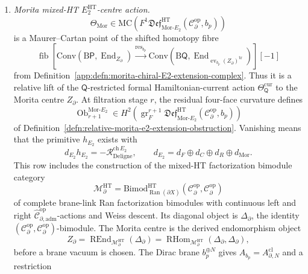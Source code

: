 \begin{defn}
\begin{enumerate}[label=\textup{(D\arabic*)}]
	  \item \emph{Morita mixed-HT \(E_2^{\mathrm{HT}}\)-centre action.}
    \[
      \Theta_{\mathrm{Mor}}
      \in
      \mathrm{MC}\!\left(
      F^1\mathfrak{Def}^{\mathrm{HT}}_{\mathrm{Mor}\mbox{-}E_2}
      (\mathcal C^{\mathrm{op}}_\partial,b_p)\right)
    \]
    is a Maurer--Cartan point of the shifted homotopy fibre
    \[
      \operatorname{fib}\!\left[
      \mathrm{Conv}(\mathrm B\mathsf P,\operatorname{End}_{Z_\partial})
      \xrightarrow{\operatorname{res}_{b_p}}
      \mathrm{Conv}\!\left(\mathrm B\mathsf Q,
      \operatorname{End}_{\operatorname{ev}_{b_p}(Z_\partial)^{\mathrm{tr}}}
      \right)\right][-1]
    \]
    from Definition~\ref{app:defn:morita-chiral-E2-extension-complex}.
    Thus it is a relative lift of the \(\mathsf Q\)-restricted formal
    Hamiltonian-current action \(\Theta_{\mathsf Q}^{\mathrm{cur}}\) to
    the Morita centre \(Z_\partial\).  At filtration stage \(r\), the
    residual four-face curvature defines
    \[
      \operatorname{Ob}^{\mathrm{Mor}\mbox{-}E_2}_{r+1}
      \in
      H^2\!\left(
      \operatorname{gr}^{r+1}_{F}
      \mathfrak{Def}^{\mathrm{HT}}_{\mathrm{Mor}\mbox{-}E_2}
      (\mathcal C^{\mathrm{op}}_\partial,b_p)\right)
    \]
    of
    Definition~\ref{defn:relative-morita-e2-extension-obstruction}.
    Vanishing means that the primitive \(h_{E_2}\) exists with
    \[
      d_{E_2}h_{E_2}
      =
      -\mathcal R^{\mathrm{ch}\,E_2}_{\mathrm{Deligne}},
      \qquad
      d_{E_2}=d_F\oplus d_C\oplus d_R\oplus d_{\mathrm{Mor}} .
    \]
    This row includes the construction of the mixed-HT factorization
    bimodule category
    \[
      \mathcal M^{\mathrm{HT}}_\partial
      =
      \mathrm{Bimod}^{\mathrm{HT}}_{\operatorname{Ran}(\partial X)}
      (\mathcal C^{\mathrm{op}}_\partial,
       \mathcal C^{\mathrm{op}}_\partial)
    \]
    of complete brane-link Ran factorization bimodules with continuous
    left and right
    \(\widehat{\mathcal C}^{\mathrm{op}}_{\partial,\mathrm{adm}}\)-actions
    and Weiss descent.  Its diagonal object is
    \(\Delta_\partial\), the identity
    \((\mathcal C^{\mathrm{op}}_\partial,
    \mathcal C^{\mathrm{op}}_\partial)\)-bimodule.  The Morita centre is
    the derived endomorphism object
    \[
      Z_\partial
      =
      \operatorname{REnd}_{\mathcal M^{\mathrm{HT}}_\partial}
      (\Delta_\partial)
      =
      \operatorname{RHom}_{\mathcal M^{\mathrm{HT}}_\partial}
      (\Delta_\partial,\Delta_\partial),
    \]
    before a brane vacuum is chosen.  The Dirac brane \(b_p^{\oplus N}\)
    gives \(A_{b_p}=A^{\mathrm{cl}}_{\partial,N}\) and a restriction

\end{enumerate}
\end{defn}
